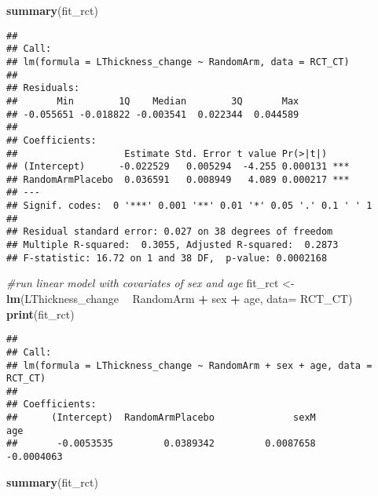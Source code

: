 \documentclass[]{article}
\newenvironment{Shaded}{\begin{snugshade}}{\end{snugshade}}
\newcommand{\KeywordTok}[1]{\textcolor[rgb]{0.13,0.29,0.53}{\textbf{#1}}}
\newcommand{\DataTypeTok}[1]{\textcolor[rgb]{0.13,0.29,0.53}{#1}}
\newcommand{\StringTok}[1]{\textcolor[rgb]{0.31,0.60,0.02}{#1}}
\newcommand{\CommentTok}[1]{\textcolor[rgb]{0.56,0.35,0.01}{\textit{#1}}}
\newcommand{\OperatorTok}[1]{\textcolor[rgb]{0.81,0.36,0.00}{\textbf{#1}}}
\newcommand{\NormalTok}[1]{#1}
\theoremstyle{definition}
\theoremstyle{definition}
\theoremstyle{definition}
\theoremstyle{remark}
\begin{document}
\begin{Shaded}
\begin{Highlighting}[]
  \KeywordTok{summary}\NormalTok{(fit_rct)}
\end{Highlighting}
\end{Shaded}

\begin{verbatim}
## 
## Call:
## lm(formula = LThickness_change ~ RandomArm, data = RCT_CT)
## 
## Residuals:
##       Min        1Q    Median        3Q       Max 
## -0.055651 -0.018822 -0.003541  0.022344  0.044589 
## 
## Coefficients:
##                   Estimate Std. Error t value Pr(>|t|)    
## (Intercept)      -0.022529   0.005294  -4.255 0.000131 ***
## RandomArmPlacebo  0.036591   0.008949   4.089 0.000217 ***
## ---
## Signif. codes:  0 '***' 0.001 '**' 0.01 '*' 0.05 '.' 0.1 ' ' 1
## 
## Residual standard error: 0.027 on 38 degrees of freedom
## Multiple R-squared:  0.3055, Adjusted R-squared:  0.2873 
## F-statistic: 16.72 on 1 and 38 DF,  p-value: 0.0002168
\end{verbatim}

\begin{Shaded}
\begin{Highlighting}[]
\CommentTok{#run linear model with covariates of sex and age}
\NormalTok{  fit_rct <-}\StringTok{ }\KeywordTok{lm}\NormalTok{(LThickness_change }\OperatorTok{~}\StringTok{ }\NormalTok{RandomArm }\OperatorTok{+}\StringTok{ }\NormalTok{sex }\OperatorTok{+}\StringTok{ }\NormalTok{age, }\DataTypeTok{data=}\NormalTok{ RCT_CT)}
  \KeywordTok{print}\NormalTok{(fit_rct)}
\end{Highlighting}
\end{Shaded}

\begin{verbatim}
## 
## Call:
## lm(formula = LThickness_change ~ RandomArm + sex + age, data = RCT_CT)
## 
## Coefficients:
##      (Intercept)  RandomArmPlacebo              sexM               age  
##       -0.0053535         0.0389342         0.0087658        -0.0004063
\end{verbatim}

\begin{Shaded}
\begin{Highlighting}[]
  \KeywordTok{summary}\NormalTok{(fit_rct)}
\end{Highlighting}
\end{Shaded}
\end{document}
